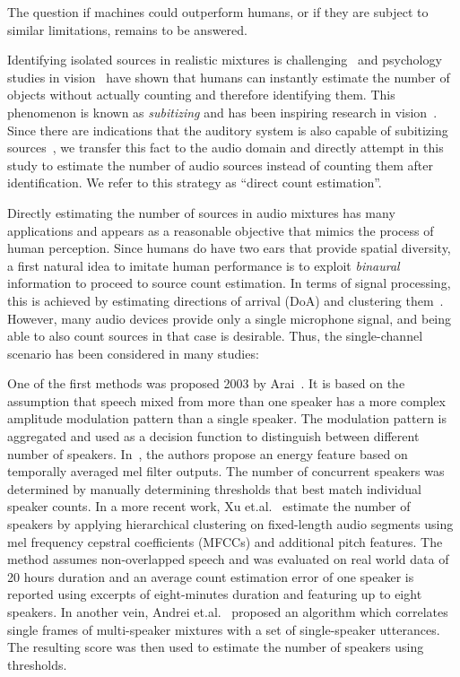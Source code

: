 The question if machines could outperform humans, or if they are subject to similar limitations, remains to be answered.
%
\par
Identifying isolated sources in realistic mixtures is challenging~\cite{bregman} and psychology studies in vision~\cite{jevons1871} have shown that humans can instantly estimate the number of objects without actually counting and therefore identifying them.
This phenomenon is known as \textit{subitizing} and has been inspiring research in vision~\cite{chattopadhyay17}.
Since there are indications that the auditory system is also capable of subitizing sources~\cite{hoopen79}, we transfer this fact to the audio domain and directly attempt in this study to estimate the number of audio sources instead of counting them after identification.
We refer to this strategy as ``direct count estimation''.

\par

Directly estimating the number of sources in audio mixtures has many applications and appears as a reasonable objective that mimics the process of human perception.
Since humans do have two ears that provide spatial diversity, a first natural idea to imitate human performance is to exploit \textit{binaural} information to proceed to source count estimation.
In terms of signal processing, this is achieved by estimating directions of arrival (DoA) and clustering them~\cite{loesch08, araki09, arberet10, pavlidi12, drude14_icassp, mirzaei15, walter15, Pasha17_reverb}.
However, many audio devices provide only a single microphone signal, and being able to also count sources in that case is desirable. Thus, the single-channel scenario has been considered in many studies:
\par
One of the first methods was proposed 2003 by Arai~\cite{arai03}.
It is based on the assumption that speech mixed from more than one speaker has a more complex amplitude modulation pattern than a single speaker.
The modulation pattern is aggregated and used as a decision function to distinguish between different number of speakers.
In~\cite{sayoud10}, the authors propose an energy feature based on temporally averaged mel filter outputs.
The number of concurrent speakers was determined by manually determining thresholds that best match individual speaker counts.
In a more recent work,
Xu et.al.~\cite{xu13} estimate the number of speakers by applying hierarchical clustering on fixed-length audio segments using mel frequency cepstral coefficients (MFCCs) and additional pitch features.
The method assumes non-overlapped speech and was evaluated on real world data of 20 hours duration and an average count estimation error of one speaker is reported using excerpts of eight-minutes duration and featuring up to eight speakers.
In another vein, Andrei et.al.~\cite{andrei15_interspeech} proposed an algorithm which correlates single frames of multi-speaker mixtures with a set of single-speaker utterances.
The resulting score was then used to estimate the number of speakers using thresholds.

